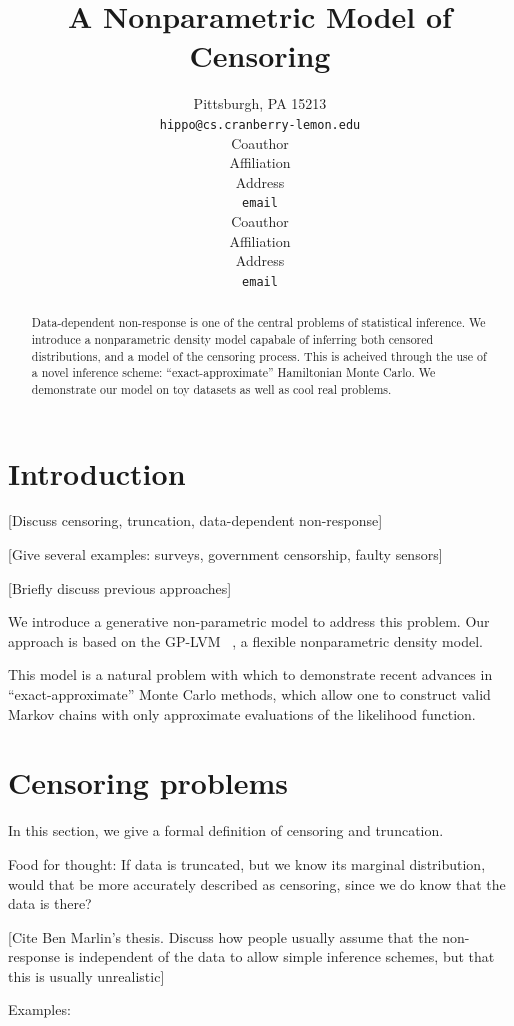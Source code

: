 \documentclass{article}
\title{A Nonparametric Model of Censoring}
\author{
Pittsburgh, PA 15213 \\
\texttt{hippo@cs.cranberry-lemon.edu} \\
\And
Coauthor \\
Affiliation \\
Address \\
\texttt{email} \\
\AND
Coauthor \\
Affiliation \\
Address \\
\texttt{email} \\
}
\begin{document}
\maketitle

\begin{abstract}
Data-dependent non-response is one of the central problems of statistical inference.  We introduce a nonparametric density model capabale of inferring both censored distributions, and a model of the censoring process.  This is acheived through the use of a novel inference scheme: ``exact-approximate'' Hamiltonian Monte Carlo.  We demonstrate our model on toy datasets as well as cool real problems.
\end{abstract}

\section{Introduction}

[Discuss censoring, truncation, data-dependent non-response]

[Give several examples: surveys, government censorship, faulty sensors]

[Briefly discuss previous approaches]

We introduce a generative non-parametric model to address this problem.  Our approach is based on the GP-LVM ~\cite{lawrence2004gaussian,salzmann2008local,lawrence2009non}, a flexible nonparametric density model.

This model is a natural problem with which to demonstrate recent advances in ``exact-approximate'' Monte Carlo methods, which allow one to construct valid Markov chains with only approximate evaluations of the likelihood function.

\section{Censoring problems}

In this section, we give a formal definition of censoring and truncation.

Food for thought: If data is truncated, but we know its marginal distribution, would that be more accurately described as censoring, since we do know that the data is there?

[Cite Ben Marlin's thesis. Discuss how people usually assume that the non-response is independent of the data to allow simple inference schemes, but that this is usually unrealistic]

Examples: 
\end{document}
